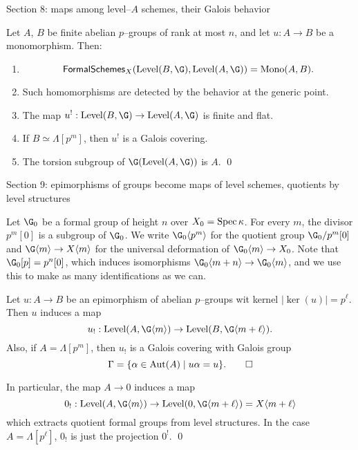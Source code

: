 Section 8: maps among level--$A$ schemes, their Galois behavior

\begin{theorem}
Let $A$, $B$ be finite abelian $p$--groups of rank at most $n$, and let $u: A \to B$ be a monomorphism. Then:
\begin{enumerate}
\item \[\CatOf{FormalSchemes}_X(\Level(B, \G), \Level(A, \G)) = \operatorname{Mono}(A, B).\]
\item Such homomorphisms are detected by the behavior at the generic point.
\item The map $u^!: \Level(B, \G) \to \Level(A, \G)$ is finite and flat.
\item If $B \simeq \Lambda[p^m]$, then $u^!$ is a Galois covering.
\item The torsion subgroup of $\G(\Level(A, \G))$ is $A$. \qed
\end{enumerate}
\end{theorem}

Section 9: epimorphisms of groups become maps of level schemes, quotients by level structures

Let $\G_0$ be a formal group of height $n$ over $X_0 = \operatorname{Spec} \kappa$.  For every $m$, the divisor $p^m[0]$ is a subgroup of $\G_0$.  We write $\G_0\<p^m\>$ for the quotient group $\G_0 / p^m[0]$ and $\G\<m\> \to X\<m\>$ for the universal deformation of $\G_0\<m\> \to X_0$.  Note that $\G_0[p] = p^n[0]$, which induces isomorphisms $\G_0\<m+n\> \to \G_0\<m\>$, and we use this to make as many identifications as we can.

\begin{lemma}
Let $u: A \to B$ be an epimorphism of abelian $p$--groups wit kernel $|\ker(u)| = p^\ell$.  Then $u$ induces a map \[u_!: \Level(A, \G\<m\>) \to \Level(B, \G\<m+\ell\>).\]  Also, if $A = \Lambda[p^m]$, then $u_!$ is a Galois covering with Galois group \[\Gamma = \{\alpha \in \operatorname{Aut}(A) \mid u\alpha = u\}. \qed\]
\end{lemma}

\begin{corollary}
In particular, the map $A \to 0$ induces a map \[0_!: \Level(A, \G\<m\>) \to \Level(0, \G\<m+\ell\>) = X\<m+\ell\>\] which extracts quotient formal groups from level structures.  In the case $A = \Lambda[p^\ell]$, $0_!$ is just the projection $0^!$. \qed
\end{corollary}

